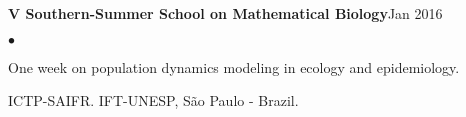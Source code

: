 \documentclass[margin,line]{res}
\newenvironment{list2}{
  \begin{list}{$\bullet$}{%
      \setlength{\itemsep}{0in}
      \setlength{\parsep}{0in} \setlength{\parskip}{0in}
      \setlength{\topsep}{0in} \setlength{\partopsep}{0in}
      \setlength{\leftmargin}{0.2in}}}{\end{list}}
\begin{document}
\begin{resume}
{\bf V Southern-Summer School on Mathematical Biology}\hfill {Jan 2016}\\
	\vspace*{-.1in}%
\begin{list2} %
	\item One week on population dynamics modeling in ecology and epidemiology.%
	\item ICTP-SAIFR. IFT-UNESP, S{\~a}o Paulo - Brazil.%
\end{list2}






\end{resume}
\end{document}
